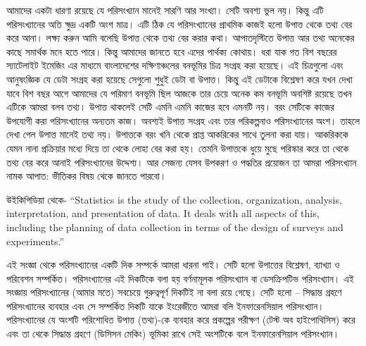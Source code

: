 \documentclass[11pt, twoside, openright, a4paper,xetex]{book}\usepackage[]{graphicx}\usepackage[]{color}
\begin{document}
আমাদের একটা ধারণা রয়েছে যে পরিসংখ্যান মানেই সারণি আর সংখ্যা। সেটি অবশ্য ভুল নয়। কিন্তু এটি পরিসংখ্যানের অতি ক্ষুদ্র একটি অংশ মাত্র। এটি ঠিক যে পরিসংখ্যানের প্রাথমিক কাজই হলো উপাত্ত থেকে তথ্য বের করে আনা। লক্ষ্য করুন আমি বলেছি উপাত্ত থেকে তথ্য বের করার কথা। আপাতদৃস্টিতে উপাত্ত আর তথ্য অনেকের কাছে সমার্থক মনে হতে পারে। কিন্তু আমাদের জানতে হবে এদের পার্থক্য কোথায়।
ধরা যাক গত বিশ বছরের স্যাটেলাইট ইমেজিং এর মাধ্যমে বাংলাদেশের দক্ষিণাঞ্চলের বনভূমির চিত্র সংগ্রহ করা হয়েছে। এই চিত্রগুলো এবং আনুষংজ্ঞিক যে ডেটা সংগ্রহ করা হয়েছে সেগুলো শুধুই ডেটা বা উপাত্ত। কিন্তু এই ডেটাকে বিশ্লেষণ করে যখন দেখা যাবে বিশ বছর আগে আমাদের যে পরিমাণ বনভূমি ছিল আজকে তার চেয়ে অনেক কম বনভূমি অবশিষ্ট রয়েছে তখন এটিকে আমরা বলব তথ্য। উপাত্ত থাকলেই সেটি এমনি এমনি কাজের হবে এমনটি নয়। বরং সেটিকে কাজের উপযোগী করা পরিসংখ্যানের অন্যতম কাজ। অবশ্যই উপাত্ত সংগ্রহ এবং তার পরিকল্পনাও পরিসংখ্যানের অংশ।
তাহলে দেখা গেল উপাত্ত মানেই তথ্য নয়। উপাত্তকে বরং খনি থেকে প্রাপ্ত আকরিকের সাথে তুলনা করা যায়। আকরিককে যেমন নানা প্রক্রিয়ার মধ্যে দিয়ে তা থেকে লোহা বের করা হয়। তেমনি  উপাত্তকে ধুয়ে মুছে পরিস্কার করে তা থেকে তথ্য বের করে আনাই পরিসংখ্যানের উদ্দেশ্য। আর সেজন্য যেসব উপকরণ ও পদ্ধতির প্রয়োজন তা আমরা পরিসংখ্যান নামক আপাত: ভীতিকর বিষয় থেকে জানতে পারবো।

উইকিপিডিয়া থেকে- ``Statistics is the study of the collection, organization, analysis, interpretation, and presentation of data. It deals with all aspects of this, including the planning of data collection in terms of the design of surveys and experiments.''

এই সংজ্ঞা থেকে পরিসংখ্যানের একটি দিক সম্পর্কে আমরা ধারনা পাই। সেটি হলো উপাত্তের বিশ্লেষণ, ব্যাখ্যা ও পরিবেশন সম্পর্কিত। পরিসংখ্যানের এই দিকটিকে বলা হয় বর্ণনামূলক পরিসংখ্যান বা ডেসক্রিপটিভ পরিসংখ্যান। এই সংজ্ঞায় পরিসংখ্যানের (আমার মতে) সবচেয়ে গুরুত্বপূর্ণ দিকটিই না বলা রয়ে গেছে। সেটি হলো – সিদ্ধান্ত গ্রহণে পরিসংখ্যানের ব্যবহার এবং সে সম্পর্কিত দিকটি যাকে ইংরেজীতে আমরা বলি ইনফারেনসিয়াল পরিসংখ্যান। পরিসংখ্যানের যে অংশটি পরিশোধিত উপাত্ত (তথ্য)-কে ব্যবহার করে প্রকল্পের পরীক্ষণ (টেস্ট অব হাইপোথিসিস) করে এবং তা থেকে সিদ্ধান্ত গ্রহণে (ডিসিসন মেকিং) ভূমিকা রাখে সেই অংশটিকে বলে ইনফারেনসিয়াল পরিসংখ্যান।




% 
%
%





\end{document}
